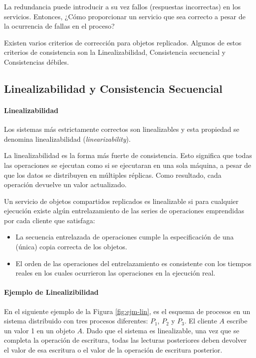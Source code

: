    La redundancia puede introducir a su vez fallos (respuestas incorrectas) en los servicios. Entonces, ¿Cómo proporcionar un servicio que sea correcto a pesar de la ocurrencia de fallas en el proceso?
   
   
   
 Existen varios criterios de corrección para objetos replicados. Algunos de estos  criterios de consistencia son la  Linealizabilidad,  Consistencia secuencial y  Consistencias débiles.
 
 \subsection{Linealizabilidad y Consistencia Secuencial}
 \paragraph{Linealizabilidad}
  Los sistemas más estrictamente correctos son linealizables y esta propiedad se denomina linealizabilidad (\textit{linearizability}). 
 
 La linealizabilidad es la forma más fuerte de \gls{consistencia}. Esto significa que todas las operaciones se ejecutan como si se ejecutaran en una sola máquina, a pesar de que los datos se distribuyen en múltiples réplicas. Como resultado, cada operación devuelve un valor actualizado.
 
 Un servicio de objetos compartidos replicados es linealizable si para cualquier ejecución existe algún entrelazamiento de las series de operaciones emprendidas por cada cliente que satisfaga:
 \begin{itemize}
 	\item  La secuencia entrelazada de operaciones cumple la especificación de una (única) copia correcta de los objetos.
 	\item El orden de las operaciones del entrelazamiento es consistente con los tiempos reales en los cuales ocurrieron las operaciones en la ejecución real.
 \end{itemize}
 
 \paragraph{Ejemplo de Linealizibilidad }
 
 
 En el siguiente ejemplo de la Figura \ref{fig:ejm-lin}, es el esquema de procesos en un  sistema distribuido con tres procesos diferentes: $P_{1}$, $P_{2}$ y $P_{3}$. El cliente $A$ escribe un valor 1 en un objeto $A$. Dado que el sistema es linealizable, una vez que se completa la operación de escritura, todas las lecturas posteriores deben devolver el valor de esa escritura o el valor de la operación de escritura posterior. 
 
